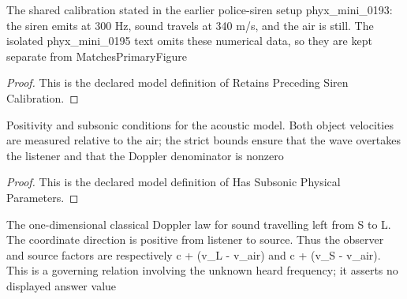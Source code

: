 \begin{definition}
  \label{def:physics:phyx-mini-0195:phyxminiproblems-problemphyxmini0195-retainsprecedingsirencalibration}
  The shared calibration stated in the earlier police-siren setup phyx\_mini\_0193: the siren emits at 300 Hz, sound travels at 340 m/s, and the air is still. The isolated phyx\_mini\_0195 text omits these numerical data, so they are kept separate from MatchesPrimaryFigure
\end{definition}
\begin{proof}
  This is the declared model definition of Retains Preceding Siren Calibration.
\end{proof}
\begin{definition}
  \label{def:physics:phyx-mini-0195:phyxminiproblems-problemphyxmini0195-hassubsonicphysicalparameters}
  Positivity and subsonic conditions for the acoustic model. Both object velocities are measured relative to the air; the strict bounds ensure that the wave overtakes the listener and that the Doppler denominator is nonzero
\end{definition}
\begin{proof}
  This is the declared model definition of Has Subsonic Physical Parameters.
\end{proof}
\begin{definition}
  \label{def:physics:phyx-mini-0195:phyxminiproblems-problemphyxmini0195-satisfiesleftwardacousticdopplerlaw}
  The one-dimensional classical Doppler law for sound travelling left from S to L. The coordinate direction is positive from listener to source. Thus the observer and source factors are respectively c + (v\_L - v\_air) and c + (v\_S - v\_air). This is a governing relation involving the unknown heard frequency; it asserts no displayed answer value
\end{definition}
